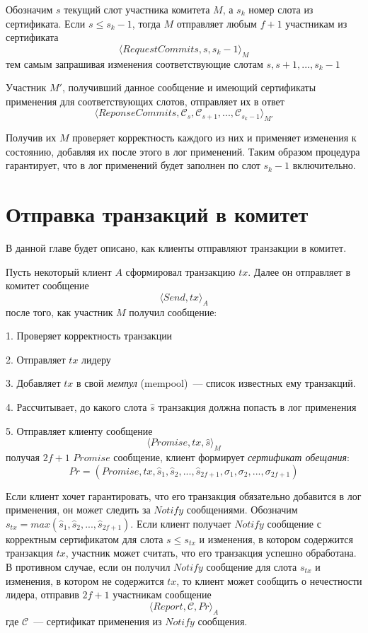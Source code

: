Обозначим $s$ текущий слот участника комитета $M$, а $s_k$ номер слота из сертификата. Если $s \le s_k-1$, тогда $M$ отправляет любым $f+1$ участникам из сертификата 
\[ \langle RequestCommits, s, s_k-1 \rangle_M \]
тем самым запрашивая изменения соответствующие слотам $s, s+1,..., s_k-1$

Участник $M'$, получивший данное сообщение и имеющий сертификаты применения для соответствующих слотов, отправляет их в ответ
\[ \langle ReponseCommits, \mathcal{C}_s, \mathcal{C}_{s+1},...,\mathcal{C}_{s_k-1} \rangle_{M'} \]

Получив их $M$ проверяет корректность каждого из них и применяет изменения к состоянию, добавляя их после этого в лог применений. Таким образом процедура гарантирует, что в лог применений будет заполнен по слот $s_k-1$ включительно.

\section{Отправка транзакций в комитет}
В данной главе будет описано, как клиенты отправляют транзакции в комитет.

Пусть некоторый клиент $A$ сформировал транзакцию $tx$. Далее он отправляет в комитет сообщение
\[ \langle Send, tx \rangle_A \]
после того, как участник $M$ получил сообщение:

1. Проверяет корректность транзакции

2. Отправляет $tx$ лидеру

3. Добавляет $tx$ в свой \textit{мемпул} (mempool)~--- список известных ему транзакций. 

4. Рассчитывает, до какого слота $\hat{s}$ транзакция должна попасть в лог применения

5. Отправляет клиенту сообщение
\[ \langle Promise, tx, \hat{s} \rangle_M \]
получая $2f+1$ $Promise$ сообщение, клиент формирует \textit{сертификат обещания}:
$$Pr=(Promise, tx,  \hat{s}_1,  \hat{s}_2,..., \hat{s}_{2f+1}, \sigma_1, \sigma_2,...,\sigma_{2f+1})$$

Если клиент хочет гарантировать, что его транзакция обязательно добавится в лог применения, он может следить за $Notify$ сообщениями. Обозначим $s_{tx}=max(\hat{s}_1,  \hat{s}_2,..., \hat{s}_{2f+1})$. Если клиент получает $Notify$ сообщение с корректным сертификатом для слота $s \le s_{tx}$ и изменения, в котором содержится транзакция $tx$, участник может считать, что его транзакция успешно обработана. В противном случае, если он получил $Notify$ сообщение для слота $s_{tx}$ и изменения, в котором не содержится $tx$, то клиент может сообщить о нечестности лидера, отправив $2f+1$ участникам сообщение
\[ \langle Report, \mathcal{C}, Pr \rangle_A \]
где $\mathcal{C}$~--- сертификат применения из $Notify$ сообщения.

